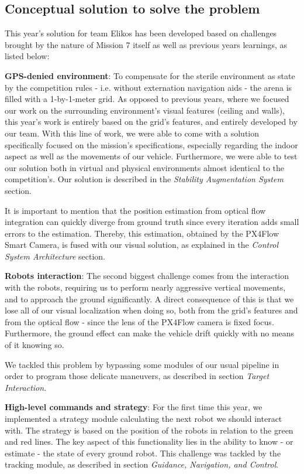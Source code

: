 \subsection*{Conceptual solution to solve the problem} \label{subsec:intro-solution}

This year’s solution for team Elikos has been developed based on challenges brought by the nature of Mission 7 itself as well as previous years learnings, as listed below:

\textbf{GPS-denied environment}: To compensate for the sterile environment as state by the competition rules - i.e. without externation navigation aids - the arena is filled with a 1-by-1-meter grid. As opposed to previous years, where we focused our work on the surrounding environment’s visual features (ceiling and walls), this year’s work is entirely based on the grid’s features, and entirely developed by our team. With this line of work, we were able to come with a solution specifically focused on the mission’s specifications, especially regarding the indoor aspect as well as the movements of our vehicle. Furthermore, we were able to test our solution both in virtual and physical environments almost identical to the competition’s. Our solution is described in the \textit{Stability Augmentation System} section.

It is important to mention that the position estimation from optical flow integration can quickly diverge from ground truth since every iteration adds small errors to the estimation. Thereby, this estimation, obtained by the PX4Flow Smart Camera, is fused with our visual solution, as explained in the \textit{Control System Architecture} section.

\textbf{Robots interaction}: The second biggest challenge comes from the interaction with the robots, requiring us to perform nearly aggressive vertical movements, and to approach the ground significantly. A direct consequence of this is that we lose all of our visual localization  when doing so, both from the grid’s features and from the optical flow - since the lens of the PX4Flow camera is fixed focus. Furthermore,  the ground effect can make the vehicle drift quickly with no means of it knowing so.

We tackled this problem by bypassing some modules of our usual pipeline in order to program those delicate maneuvers, as described in section \textit{Target Interaction}.

\textbf{High-level commands and strategy}: For the first time this year, we implemented a strategy module calculating the next robot we should interact with. The strategy is based on the position of the robots in relation to the green and red lines. The key aspect of this functionality lies in the ability to know - or estimate - the state of every ground robot. This challenge was tackled by the tracking module, as described in section \textit{Guidance, Navigation, and Control}.

